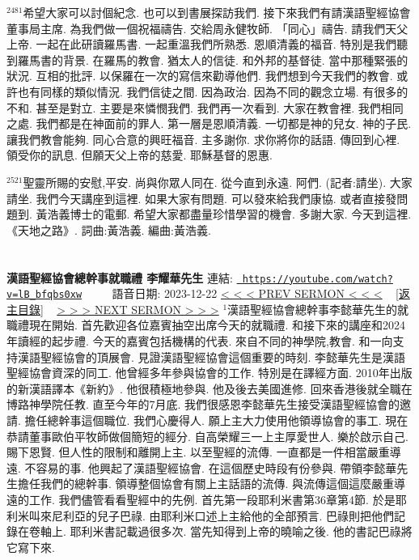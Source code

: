\documentclass{book}
\begin{document}
$^{2481}$希望大家可以討個紀念.
也可以到書展探訪我們.
接下來我們有請漢語聖經協會董事局主席.
為我們做一個祝福禱告.
交給周永健牧師.
「同心」禱告.
請我們天父上帝.
一起在此研讀羅馬書.
一起重溫我們所熟悉.
恩順清義的福音.
特別是我們聽到羅馬書的背景.
在羅馬的教會.
猶太人的信徒.
和外邦的基督徒.
當中那種緊張的狀況.
互相的批評.
以保羅在一次的寫信來勸導他們.
我們想到今天我們的教會.
或許也有同樣的類似情況.
我們信徒之間.
因為政治.
因為不同的觀念立場.
有很多的不和.
甚至是對立.
主要是來憐憫我們.
我們再一次看到.
大家在教會裡.
我們相同之處.
我們都是在神面前的罪人.
第一層是恩順清義.
一切都是神的兒女.
神的子民.
讓我們教會能夠.
同心合意的興旺福音.
主多謝你.
求你將你的話語.
傳回到心裡.
領受你的訊息.
但願天父上帝的慈愛.
耶穌基督的恩惠.

$^{2521}$聖靈所賜的安慰,平安.
尚與你眾人同在.
從今直到永遠.
阿們.
(記者:請坐).
大家請坐.
我們今天講座到這裡.
如果大家有問題.
可以發來給我們康協.
或者直接發問題到.
黃浩義博士的電郵.
希望大家都盡量珍惜學習的機會.
多謝大家.
今天到這裡.
《天地之路》.
詞曲:黃浩義.
編曲:黃浩義.
\newpage



\section{}
\label{sec:lB_bfqbs0xw}
\textbf{漢語聖經協會總幹事就職禮 李耀華先生}
\newline
\newline
連結: \href{https://youtube.com/watch?v=lB_bfqbs0xw}{\texttt{ https://youtube.com/watch?v=lB\_bfqbs0xw}} ~~~~ 語音日期: 2023-12-22 
\newline
\newline
\hyperref[sec:VhiGoXEG1RY]{\small{< < < PREV SERMON < < <}}
~
\hyperref[sec:index]{\small{[返主目錄]}}
~
\hyperref[sec:code]{\small{> > > NEXT SERMON > > >}}
\newline
\newline
$^{1}$漢語聖經協會總幹事李懿華先生的就職禮現在開始.
首先歡迎各位嘉賓抽空出席今天的就職禮.
和接下來的講座和2024年讀經的起步禮.
今天的嘉賓包括機構的代表.
來自不同的神學院,教會.
和一向支持漢語聖經協會的頂展會.
見證漢語聖經協會這個重要的時刻.
李懿華先生是漢語聖經協會資深的同工.
他曾經多年參與協會的工作.
特別是在譯經方面.
2010年出版的新漢語譯本《新約》.
他很積極地參與.
他及後去美國進修.
回來香港後就全職在博路神學院任教.
直至今年的7月底.
我們很感恩李懿華先生接受漢語聖經協會的邀請.
擔任總幹事這個職位.
我們心慶得人.
願上主大力使用他領導協會的事工.
現在恭請董事歐伯平牧師做個簡短的經分.
自高榮耀三一上主厚愛世人.
樂於啟示自己.
賜下恩賢.
但人性的限制和離開上主.
以至聖經的流傳.
一直都是一件相當嚴重導遠.
不容易的事.
他興起了漢語聖經協會.
在這個歷史時段有份參與.
帶領李懿華先生擔任我們的總幹事.
領導整個協會有關上主話語的流傳.
與流傳這個這麼嚴重導遠的工作.
我們儘管看看聖經中的先例.
首先第一段耶利米書第36章第4節.
於是耶利米叫來尼利亞的兒子巴祿.
由耶利米口述上主給他的全部預言.
巴祿則把他們記錄在卷軸上.
耶利米書記載過很多次.
當先知得到上帝的曉喻之後.
他的書記巴祿將它寫下來.
\end{document}
